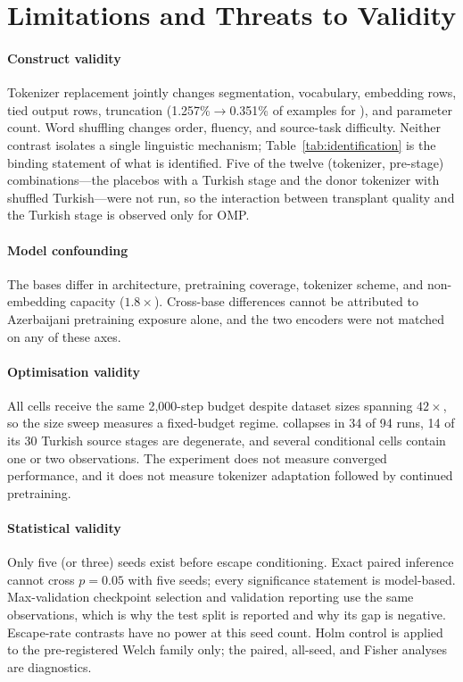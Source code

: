 \section{Limitations and Threats to Validity}
\label{sec:limitations}

\paragraph{Construct validity} Tokenizer replacement jointly changes segmentation, vocabulary, embedding rows, tied output rows, truncation (1.257\%$\to$0.351\% of examples for \xlmxv), and parameter count. Word shuffling changes order, fluency, and source-task difficulty. Neither contrast isolates a single linguistic mechanism; Table~\ref{tab:identification} is the binding statement of what is identified. Five of the twelve (tokenizer, pre-stage) combinations---the placebos with a Turkish stage and the donor tokenizer with shuffled Turkish---were not run, so the interaction between transplant quality and the Turkish stage is observed only for OMP.

\paragraph{Model confounding} The bases differ in architecture, pretraining coverage, tokenizer scheme, and non-embedding capacity ($1.8\times$). Cross-base differences cannot be attributed to Azerbaijani pretraining exposure alone, and the two encoders were not matched on any of these axes.

\paragraph{Optimisation validity} All cells receive the same 2{,}000-step budget despite dataset sizes spanning $42\times$, so the size sweep measures a fixed-budget regime. \xlmxv{} collapses in 34 of 94 runs, 14 of its 30 Turkish source stages are degenerate, and several conditional cells contain one or two observations. The experiment does not measure converged performance, and it does not measure tokenizer adaptation followed by continued pretraining.

\paragraph{Statistical validity} Only five (or three) seeds exist before escape conditioning. Exact paired inference cannot cross $p=0.05$ with five seeds; every significance statement is model-based. Max-validation checkpoint selection and validation reporting use the same observations, which is why the test split is reported and why its gap is negative. Escape-rate contrasts have no power at this seed count. Holm control is applied to the pre-registered Welch family only; the paired, all-seed, and Fisher analyses are diagnostics.

